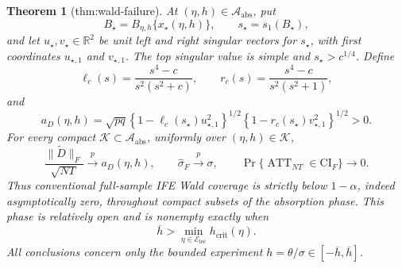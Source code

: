 \documentclass{article}
\newtheorem{theorem}{Theorem}
\begin{document}
\begin{theorem}[thm:wald-failure]\label{thm:wald-failure}
At \((\eta,h)\in\mathcal A_{\mathrm{abs}}\), put
\[
B_\star=B_{\eta,h}\{x_\star(\eta,h)\},
\qquad s_\star=s_1(B_\star),
\]
and let \(u_\star,v_\star\in\mathbb R^2\) be unit left and right singular vectors for \(s_\star\), with first coordinates \(u_{\star,1}\) and \(v_{\star,1}\).  The top singular value is simple and \(s_\star>c^{1/4}\).  Define
\[
\ell_c(s)=\frac{s^4-c}{s^2(s^2+c)},
\qquad
r_c(s)=\frac{s^4-c}{s^2(s^2+1)},
\]
and
\[
a_D(\eta,h)=\sqrt{pq}
\left\{1-\ell_c(s_\star)u_{\star,1}^2\right\}^{1/2}
\left\{1-r_c(s_\star)v_{\star,1}^2\right\}^{1/2}>0.
\]
For every compact \(\mathcal K\subset\mathcal A_{\mathrm{abs}}\), uniformly over \((\eta,h)\in\mathcal K\),
\[
\frac{\|\widetilde D\|_F}{\sqrt{NT}}\xrightarrow{p}a_D(\eta,h),
\qquad
\widehat\sigma_F\xrightarrow{p}\sigma,
\qquad
\Pr\{\operatorname{ATT}_{NT}\in\mathrm{CI}_F\}\longrightarrow0.
\]
Thus conventional full-sample IFE Wald coverage is strictly below \(1-\alpha\), indeed asymptotically zero, throughout compact subsets of the absorption phase.  This phase is relatively open and is nonempty exactly when
\[
\overline h>\min_{\eta\in\mathcal E_{\mathrm{loc}}}h_{\mathrm{crit}}(\eta).
\]
All conclusions concern only the bounded experiment \(h=\theta/\sigma\in[-\overline h,\overline h]\).
\end{theorem}
\end{document}
